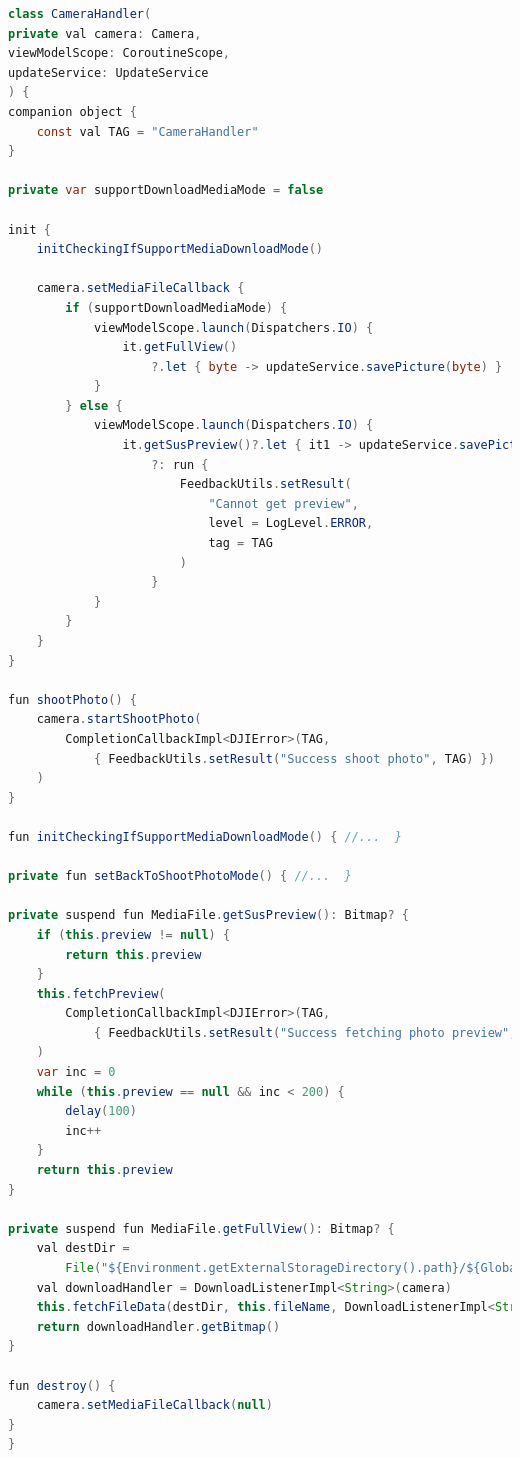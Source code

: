 \begin{lstlisting}[language=Java, caption=Klasa \textit{CameraHandler}]
class CameraHandler(
private val camera: Camera,
viewModelScope: CoroutineScope,
updateService: UpdateService
) {
companion object {
    const val TAG = "CameraHandler"
}

private var supportDownloadMediaMode = false

init {
    initCheckingIfSupportMediaDownloadMode()

    camera.setMediaFileCallback {
        if (supportDownloadMediaMode) {
            viewModelScope.launch(Dispatchers.IO) {
                it.getFullView()
                    ?.let { byte -> updateService.savePicture(byte) }
            }
        } else {
            viewModelScope.launch(Dispatchers.IO) {
                it.getSusPreview()?.let { it1 -> updateService.savePicture(it1) }
                    ?: run {
                        FeedbackUtils.setResult(
                            "Cannot get preview",
                            level = LogLevel.ERROR,
                            tag = TAG
                        )
                    }
            }
        }
    }
}

fun shootPhoto() {
    camera.startShootPhoto(
        CompletionCallbackImpl<DJIError>(TAG,
            { FeedbackUtils.setResult("Success shoot photo", TAG) })
    )
}

fun initCheckingIfSupportMediaDownloadMode() { //...  }

private fun setBackToShootPhotoMode() { //...  }

private suspend fun MediaFile.getSusPreview(): Bitmap? {
    if (this.preview != null) {
        return this.preview
    }
    this.fetchPreview(
        CompletionCallbackImpl<DJIError>(TAG,
            { FeedbackUtils.setResult("Success fetching photo preview", TAG) })
    )
    var inc = 0
    while (this.preview == null && inc < 200) {
        delay(100)
        inc++
    }
    return this.preview
}

private suspend fun MediaFile.getFullView(): Bitmap? {
    val destDir =
        File("${Environment.getExternalStorageDirectory().path}/${GlobalConfig.FOLDER_FOR_HQ_MEDIA}/")
    val downloadHandler = DownloadListenerImpl<String>(camera)
    this.fetchFileData(destDir, this.fileName, DownloadListenerImpl<String>(camera))
    return downloadHandler.getBitmap()
}

fun destroy() {
    camera.setMediaFileCallback(null)
}
}
\end{lstlisting}


